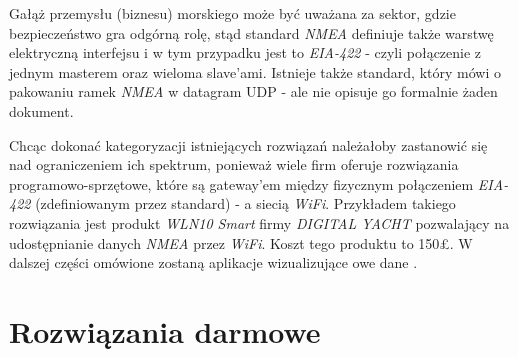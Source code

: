 \documentclass[skorowidz,skroty]{dyplomWEZUT}
\begin{document}
Gałąż przemysłu (biznesu) morskiego może być uważana za sektor, gdzie bezpieczeństwo gra odgórną rolę, stąd standard \textit{NMEA} definiuje także warstwę elektryczną interfejsu i w tym przypadku jest to \textit{EIA-422} - czyli połączenie z jednym masterem oraz wieloma slave'ami. Istnieje także standard, który mówi o pakowaniu ramek \textit{NMEA} w datagram UDP - ale nie opisuje go formalnie żaden dokument.

Chcąc dokonać kategoryzacji istniejących rozwiązań należałoby zastanowić się nad ograniczeniem ich spektrum, ponieważ wiele firm oferuje rozwiązania programowo-sprzętowe, które są gateway'em między fizycznym połączeniem \textit{EIA-422} (zdefiniowanym przez standard) - a siecią \textit{WiFi}. Przykładem takiego rozwiązania jest produkt \textit{WLN10 Smart} firmy \textit{DIGITAL YACHT} \cite{DIGITALYACHT} pozwalający na udostępnianie danych \textit{NMEA} przez \textit{WiFi}. Koszt tego produktu to 150£. W dalszej części omówione zostaną aplikacje wizualizujące owe dane .

\section{Rozwiązania darmowe}\label{chap: Free solutions}
\end{document}
